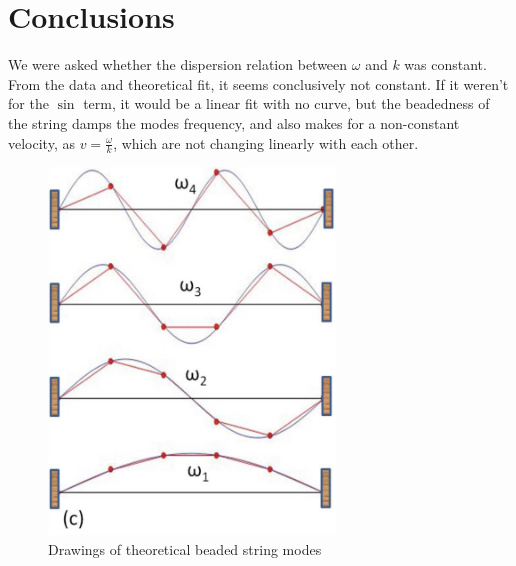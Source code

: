 \documentclass[12pt,letterpaper]{article}
\begin{document}
\section{Conclusions}

We were asked whether the dispersion relation between $\omega$ and $k$ was constant. From the data and theoretical fit, it seems conclusively not constant. If it weren't for the $\sin$ term, it would be a linear fit with no curve, but the beadedness of the string damps the modes frequency, and also makes for a non-constant velocity, as $v=\frac{\omega}{k}$, which are not changing linearly with each other.

\begin{figure}
    \centering
    \includegraphics[width=3in]{images/beaded.jpg}
    \caption{Drawings of theoretical beaded string modes}
    \label{fig:beaded}
\end{figure}

% 
% 
\end{document}
